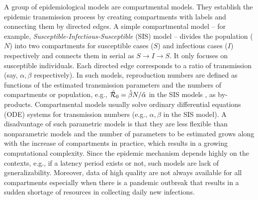 



A group of epidemiological models are compartmental models. They establish the epidemic transmission process by creating compartments with labels and connecting them by directed edges. A simple compartmental model -- for example, \textit{Susceptible-Infectious-Susceptible} (SIS) model -- divides the population ($N$) into two compartments for susceptible cases ($S$) and infectious cases ($I$) respectively and connects them in serial as $S\to I\to S$. It only focuses on susceptible individuals. Each directed edge corresponds to a ratio of transmission (say, $\alpha,\beta$ respectively). In such models, reproduction numbers are defined as functions of the estimated transmission parameters and the numbers of compartments or population, e.g., $\hat{\mathcal{R}}_0=\hat{\beta} N/\hat{\alpha}$ in the SIS models \cite{brauer2019mathematical}, as by-products. Compartmental models usually solve ordinary differential equations (ODE) systems for transmission numbers (e.g., $\alpha,\beta$ in the SIS model). A disadvantage of such parametric models is that they are less flexible than nonparametric models and the number of parameters to be estimated grows along with the increase of compartments in practice, which results in a growing computational complexity. Since the epidemic mechanism depends highly on the contexts, e.g., if a latency period exists or not, such models are lack of generalizability. Moreover, data of high quality are not always available for all compartments especially when there is a pandemic outbreak that results in a sudden shortage of resources in collecting daily new infections. %

